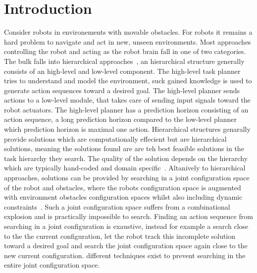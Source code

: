 \chapter{Introduction}
\label{chap:introduction}
Consider robots in environements with movable obstacles. For robots it remains a hard problem to navigate and act in new, unseen environments. Most approaches controlling the robot and acting as the robot brain fall in one of two categories. The bulk falls into hierarchical approaches~\cite{kaelbling_hierarchical_2011,scholz_navigation_2016,krontiris_dealing_2015}, an hierarchical structure generally consists of an high-level and low-level component. The high-level task planner tries to understand and model the environment, suck gained knowledge is used to generate action sequences toward a desired goal. The high-level planner sends actions to a low-level module, that takes care of sending input signals toward the robot actuators. The high-level planner has a prediction horizon consisting of an action sequence, a long prediction horizon compared to the low-level planner which prediction horizon is maximal one action. Hierarchical structures genarally provide solutions which are computationally effecient but are hierarchical solutions, meaning the solutions found are are teh best feasible solutions in the task hierarchy they search. The quality of the solution depends on the hierarchy which are typically hand-coded and domain specific~\cite{vega-brown_asymptotically_2020}. Altanively to hierarchical approaches, solutions can be provided by searching in a joint configuration space of the robot and obstacles, where the robots configuration space is augmented with environment obstacles configuration spaces whilst also including dynamic constraints~\cite{hauser_multimodal_2010,berenson_manipulation_2009,jaillet_path_2013}. Such a joint configuration space suffers from a combinational explosion and is practically impossible to search. Finding an action sequence from searching in a joint configuration is exaustive, instead for example a search close to the the current configuration, let the robot track this incomplete solution toward a desired goal and search the joint configuration space again close to the new current configuration. different techniques exist to prevent searching in the entire joint configuration space.\bs

